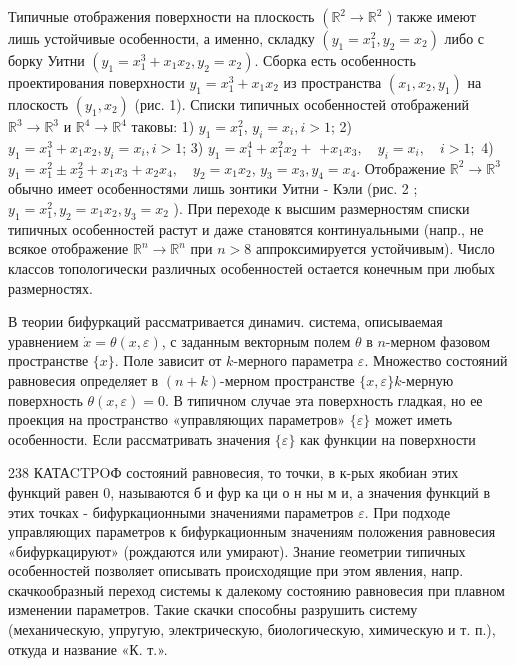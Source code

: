 \documentclass[10pt]{article}
\begin{document}
Типичные отображения поверхности на плоскость $\left(\mathbb{R}^{2} \rightarrow \mathbb{R}^{2}\right.$ ) также имеют лишь устойчивые особенности, а именно, складку $\left(y_{1}=x_{1}^{2}, y_{2}=x_{2}\right)$ либо с борку Уитни $\left(y_{1}=x_{1}^{3}+x_{1} x_{2}, y_{2}=x_{2}\right)$. Сборка есть особенность проектирования поверхности $y_{1}=x_{1}^{3}+x_{1} x_{2}$ из пространства $\left(x_{1}, x_{2}, y_{1}\right)$ на плоскость $\left(y_{1}, x_{2}\right)$ (рис. 1). Списки типичных особенностей отображений $\mathbb{R}^{3} \rightarrow \mathbb{R}^{3}$ и $\mathbb{R}^{4} \rightarrow \mathbb{R}^{4}$ таковы: 1) $y_{1}=x_{1}^{2}$, $y_{i}=x_{i}, i>1$; 2) $y_{1}=x_{1}^{3}+x_{1} x_{2}, y_{i}=x_{i}, i>1$; 3) $y_{1}=x_{1}^{4}+x_{1}^{2} x_{2}+$ $+x_{1} x_{3}, \quad y_{i}=x_{i}, \quad i>1 ;$ 4) $y_{1}=x_{1}^{2} \pm x_{2}^{2}+x_{1} x_{3}+x_{2} x_{4}, \quad y_{2}=x_{1} x_{2}$, $y_{3}=x_{3}, y_{4}=x_{4}$. Отображение $\mathbb{R}^{2} \rightarrow \mathbb{R}^{3}$ обычно имеет особенностями лишь зонтики Уитни - Кэли (рис. 2 ; $y_{1}=x_{1}^{2}, y_{2}=x_{1} x_{2}, y_{3}=x_{2}$ ). При переходе к высшим размерностям списки типичных особенностей растут и даже становятся континуальными (напр., не всякое отображение $\mathbb{R}^{n} \rightarrow \mathbb{R}^{n}$ при $n>8$ аппроксимируется устойчивым). Число классов топологически различных особенностей остается конечным при любых размерностях.



В теории бифуркаций рассматривается динамич. система, описываемая уравнением $\dot{x}=\theta(x, \varepsilon)$, с заданным векторным полем $\theta$ в $n$-мерном фазовом пространстве $\{x\}$. Поле зависит от $k$-мерного параметра $\varepsilon$. Множество состояний равновесия определяет в $(n+k)$-мерном пространстве $\{x, \varepsilon\} k$-мерную поверхность $\theta(x, \varepsilon)=0$. В типичном случае эта поверхность гладкая, но ее проекция на пространство «управляющих параметров» $\{\varepsilon\}$ может иметь особенности. Если рассматривать значения $\{\varepsilon\}$ как функции на поверхности



238 КАТАCTPOФ состояний равновесия, то точки, в к-рых якобиан этих функций равен 0, называются б и фур ка ци о н ны м и, а значения функций в этих точках - бифуркационными значениями параметров $\varepsilon$. При подходе управляющих параметров к бифуркационным значениям положения равновесия «бифуркацируют» (рождаются или умирают). Знание геометрии типичных особенностей позволяет описывать происходящие при этом явления, напр. скачкообразный переход системы к далекому состоянию равновесия при плавном изменении параметров. Такие скачки способны разрушить систему (механическую, упругую, электрическую, биологическую, химическую и т. п.), откуда и название «К. т.».
\end{document}
